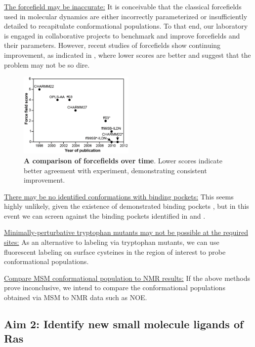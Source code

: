 \documentclass[12pt]{article}
\begin{document}
  \underline{The forcefield may be inaccurate:} It is conceivable that the classical forcefields used in molecular dynamics are either incorrectly parameterized or insufficiently detailed to recapitulate conformational populations. To that end, our laboratory is engaged in collaborative projects to benchmark and improve forcefields and their parameters. However, recent studies of forcefields show continuing improvement, as indicated in , where lower scores are better \cite{deshaw} and suggest that the problem may not be so dire. 
  \begin{figure}[H]
  \centering
  \includegraphics[width=0.5\textwidth]{foldingmark.png}
  \caption{\textbf{A comparison of forcefields over time}\cite{deshaw}. Lower scores indicate better agreement with experiment, demonstrating consistent improvement.}
  \label{forcefig}
  \end{figure}
  
  
 \underline{There may be no identified conformations with binding pockets:} This seems highly unlikely, given the existence of demonstrated binding pockets \cite{ostrem2013} \cite{fesik}, but in this event we can screen against the binding pockets identified in  \cite{ostrem2013} and \cite{fesik}.
  
 \underline{Minimally-perturbative tryptophan mutants may not be possible at the required sites:} As an alternative to labeling via tryptophan mutants, we can use fluorescent labeling on surface cysteines in the region of interest to probe conformational populations.
  
  \underline{Compare MSM conformational population to NMR results:} If the above methods prove inconclusive, we intend to compare the conformational populations obtained via MSM to NMR data such as NOE.
  
  
  
  
\subsection*{Aim 2: Identify new small molecule ligands of Ras}
\end{document}
